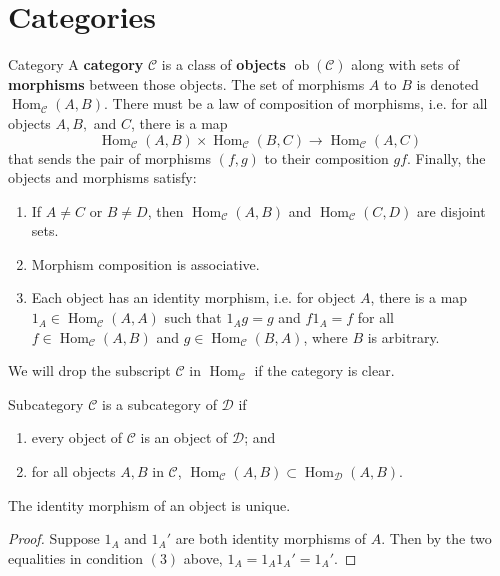 \documentclass[10pt]{report}
\DeclareMathOperator{\hh}{Hom}
\DeclareMathOperator{\ob}{ob}
\begin{document}
\tableofcontents


\section{Categories}

\begin{defn}{Category}{}
	A \textbf{category} $\mathscr{C}$ is a class of \textbf{objects} $\ob(\mathscr{C})$ along with sets of \textbf{morphisms} between those objects. The set of morphisms $A$ to $B$ is denoted $\hh_{\mathscr{C}}(A,B).$ There must be a law of composition of morphisms, i.e. for all objects $A,B,$ and $C$, there is a map
	\[
		\hh_{\mathscr{C}}(A,B) \times \hh_{\mathscr{C}}(B,C) \to \hh_{\mathscr{C}}(A,C)
	\] 
	that sends the pair of morphisms $(f,g)$ to their composition $gf$. Finally, the objects and morphisms satisfy:
	\begin{enumerate}
		\item If $A \neq C$ or $B \neq D$, then $\hh_{\mathscr{C}}(A,B)$ and $\hh_{\mathscr{C}}(C,D)$ are disjoint sets.
		\item Morphism composition is associative.
		\item Each object has an identity morphism, i.e. for object $A$, there is a map $1_{A} \in \hh_{\mathscr{C}}(A,A)$ such that $1_{A}g = g$ and $f 1_{A}=f$ for all $f \in \hh_{\mathscr{C}}(A,B)$ and $g \in \hh_{\mathscr{C}}(B,A)$, where $B$ is arbitrary.
	\end{enumerate}
\end{defn}

We will drop the subscript $\mathscr{C}$ in $\hh_{\mathscr{C}}$ if the category is clear.

\begin{defn}{Subcategory}{}
$\mathscr{C}$ is a subcategory of $\mathscr{D}$ if
\begin{enumerate}
	\item every object of $\mathscr{C}$ is an object of $\mathscr{D}$; and
	\item for all objects $A,B$ in $\mathscr{C}$, $\hh_{\mathscr{C}}(A,B) \subset \hh_{\mathscr{D}}(A,B)$.
\end{enumerate}
\end{defn}

\begin{prop}
The identity morphism of an object is unique.
\end{prop}
\begin{proof}
	Suppose $1_{A}$ and $1_{A}'$ are both identity morphisms of $A$. Then by the two equalities in condition $(3)$ above, $1_{A}=1_{A}1_{A}'=1_{A}'$.
\end{proof}
\end{document}
